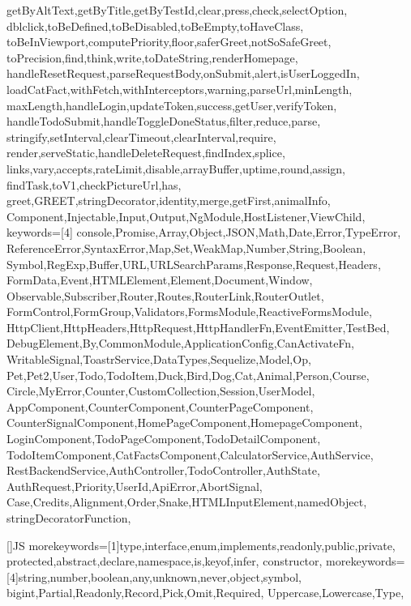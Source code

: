 {{    getByAltText,getByTitle,getByTestId,clear,press,check,selectOption,
    dblclick,toBeDefined,toBeDisabled,toBeEmpty,toHaveClass,
    toBeInViewport,computePriority,floor,saferGreet,notSoSafeGreet,
    toPrecision,find,think,write,toDateString,renderHomepage,
    handleResetRequest,parseRequestBody,onSubmit,alert,isUserLoggedIn,
    loadCatFact,withFetch,withInterceptors,warning,parseUrl,minLength,
    maxLength,handleLogin,updateToken,success,getUser,verifyToken,
    handleTodoSubmit,handleToggleDoneStatus,filter,reduce,parse,
    stringify,setInterval,clearTimeout,clearInterval,require,
    render,serveStatic,handleDeleteRequest,findIndex,splice,
    links,vary,accepts,rateLimit,disable,arrayBuffer,uptime,round,assign,
    findTask,toV1,checkPictureUrl,has,
    greet,GREET,stringDecorator,identity,merge,getFirst,animalInfo,
    Component,Injectable,Input,Output,NgModule,HostListener,ViewChild},
  keywords=[4]{
    console,Promise,Array,Object,JSON,Math,Date,Error,TypeError,
    ReferenceError,SyntaxError,Map,Set,WeakMap,Number,String,Boolean,
    Symbol,RegExp,Buffer,URL,URLSearchParams,Response,Request,Headers,
    FormData,Event,HTMLElement,Element,Document,Window,
    Observable,Subscriber,Router,Routes,RouterLink,RouterOutlet,
    FormControl,FormGroup,Validators,FormsModule,ReactiveFormsModule,
    HttpClient,HttpHeaders,HttpRequest,HttpHandlerFn,EventEmitter,TestBed,
    DebugElement,By,CommonModule,ApplicationConfig,CanActivateFn,
    WritableSignal,ToastrService,DataTypes,Sequelize,Model,Op,
    Pet,Pet2,User,Todo,TodoItem,Duck,Bird,Dog,Cat,Animal,Person,Course,
    Circle,MyError,Counter,CustomCollection,Session,UserModel,
    AppComponent,CounterComponent,CounterPageComponent,
    CounterSignalComponent,HomePageComponent,HomepageComponent,
    LoginComponent,TodoPageComponent,TodoDetailComponent,
    TodoItemComponent,CatFactsComponent,CalculatorService,AuthService,
    RestBackendService,AuthController,TodoController,AuthState,
    AuthRequest,Priority,UserId,ApiError,AbortSignal,
    Case,Credits,Alignment,Order,Snake,HTMLInputElement,namedObject,
    stringDecoratorFunction},
}

[]{JS}{
  morekeywords=[1]{type,interface,enum,implements,readonly,public,private,
                   protected,abstract,declare,namespace,is,keyof,infer,
                   constructor},
  morekeywords=[4]{string,number,boolean,any,unknown,never,object,symbol,
                   bigint,Partial,Readonly,Record,Pick,Omit,Required,
                   Uppercase,Lowercase,Type},
}

